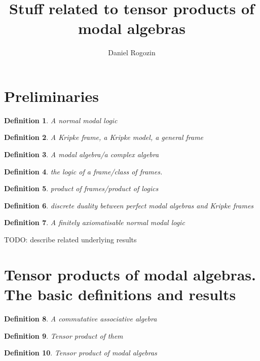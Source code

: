 \documentclass[a4paper]{article}
\author{Daniel Rogozin}
\date{}
\title{Stuff related to tensor products of modal algebras}
\theoremstyle{defin}
\newtheorem{defin}{Definition}
\theoremstyle{theorem}
\theoremstyle{prop}
\theoremstyle{lemma}
\theoremstyle{ex}
\theoremstyle{col}
\begin{document}
\maketitle

\nocite{*}

\section{Preliminaries}

\begin{defin} A normal modal logic
\end{defin}

\begin{defin} A Kripke frame, a Kripke model, a general frame
\end{defin}

\begin{defin} A modal algebra/a complex algebra
\end{defin}

\begin{defin} the logic of a frame/class of frames.
\end{defin}

\begin{defin} product of frames/product of logics
\end{defin}

\begin{defin} discrete duality between perfect modal algebras and Kripke frames
\end{defin}

\begin{defin} A finitely axiomatisable normal modal logic
\end{defin}

TODO: describe related underlying results

\section{Tensor products of modal algebras. The basic definitions and results}

\begin{defin} A commutative associative algebra
\end{defin}

\begin{defin} Tensor product of them
\end{defin}

\begin{defin} Tensor product of modal algebras
\end{defin}
\end{document}
